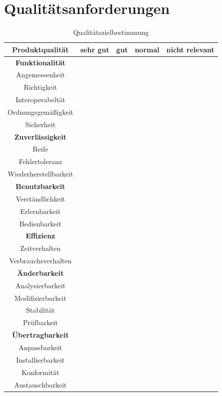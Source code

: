 \documentclass[12pt, a4paper]{article}
\begin{document}
\section{Qualitätsanforderungen}
\newcommand{\xmark}{\ding{55}}%
\begin{table}[h]
	\centering
\begin{tabular}{ || c | c | c | c | c || }
	\hline
	Produktqualität & sehr gut & gut & normal & nicht relevant  \\ \hline
	\textbf{Funktionalität} \\  \hline
	Angemessenheit & & \xmark &  &  \\ \hline
	Richtigkeit &  & \xmark &  &  \\ \hline
	Interoperabeltät &  & \xmark &  &  \\ \hline
	Ordnungsgemäßigkeit &  & \xmark &  &  \\ \hline
	Sicherheit &  & \xmark &  &  \\ \hline
	\textbf{Zuverlässigkeit} \\ \hline
	Reife & & & \xmark  &  \\ \hline
	Fehlertoleranz & & & \xmark  &  \\ \hline
	Wiederherstellbarkeit & & & \xmark  &  \\ \hline
	\textbf{Benutzbarkeit} \\ \hline
	Verständlichkeit &  \xmark & &  &  \\ \hline
	Erlernbarkeit &  &\xmark &  &  \\ \hline
	Bedienbarkeit &  \xmark & &  &  \\ \hline
	\textbf{Effizienz} \\ \hline
	Zeitverhalten &  &  & \xmark  &  \\ \hline
	Verbrauchsverhalten &  &  & \xmark  &  \\ \hline
	\textbf{Änderbarkeit} \\ \hline
	Analysierbarkeit &  &  & \xmark  &  \\ \hline
	Modifizierbarkeit &  &  & \xmark  &  \\ \hline
	Stabilität &  \xmark & & &  \\ \hline
	Prüfbarkeit &  &  & \xmark  &  \\ \hline
	\textbf{Übertragbarkeit} \\ \hline
	Anpassbarkeit &   & \xmark & &  \\ \hline
	Installierbarkeit &  &  \xmark & & \\ \hline
	Konformität &  &   \xmark & & \\ \hline
	Austauschbarkeit &  &  \xmark & & \\ \hline
\end{tabular}
\caption{Qualitätszielbestimmung}
\label{table:qualitätsanforderungen}
\end{table}
\end{document}
